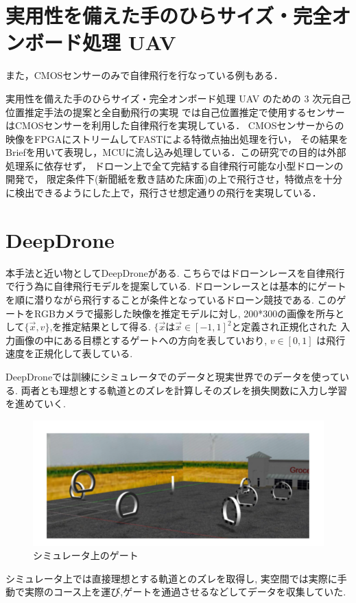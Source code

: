 \section{実用性を備えた手のひらサイズ・完全オンボード処理 UAV}
また，CMOSセンサーのみで自律飛行を行なっている例もある．

実用性を備えた手のひらサイズ・完全オンボード処理 UAV のための 3 次元自己位置推定手法の提案と全自動飛行の実現
では自己位置推定で使用するセンサーはCMOSセンサーを利用した自律飛行を実現している．
CMOSセンサーからの映像をFPGAにストリームしてFASTによる特徴点抽出処理を行い，
その結果をBriefを用いて表現し，MCUに流し込み処理している．この研究での目的は外部処理系に依存せず，
ドローン上で全て完結する自律飛行可能な小型ドローンの開発で，
限定条件下(新聞紙を敷き詰めた床面)の上で飛行させ，特徴点を十分に検出できるようにした上で，飛行させ想定通りの飛行を実現している．

\section{DeepDrone}
本手法と近い物としてDeepDroneがある.
こちらではドローンレースを自律飛行で行う為に自律飛行モデルを提案している.
ドローンレースとは基本的にゲートを順に潜りながら飛行することが条件となっているドローン競技である.
このゲートをRGBカメラで撮影した映像を推定モデルに対し,
200*300の画像を所与として$\lbrace \vec{x}, v \rbrace$,を推定結果として得る.
$\lbrace \vec{x}$は$\vec{x} \in [-1,1]^2$と定義され正規化された
入力画像の中にある目標とするゲートへの方向を表していおり,
 $v \in [0,1]$ は飛行速度を正規化して表している. 

DeepDroneでは訓練にシミュレータでのデータと現実世界でのデータを使っている.
両者とも理想とする軌道とのズレを計算しそのズレを損失関数に入力し学習を進めていく.
\begin{figure}[htbp]
  \begin{center}
    \includegraphics[clip,width=15.0cm]{img/deep-simu.png}
    \caption{シミュレータ上のゲート}
    \label{fig:gate}
  \end{center}
\end{figure}
シミュレータ上では直接理想とする軌道とのズレを取得し,
実空間では実際に手動で実際のコース上を運び,ゲートを通過させるなどしてデータを収集していた.

